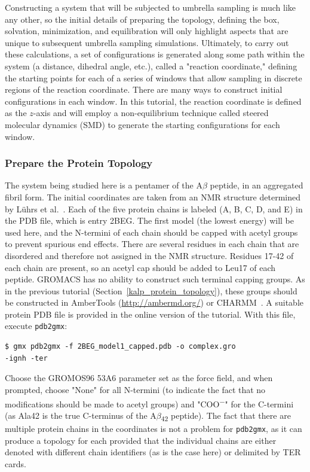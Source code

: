 \documentclass[9pt,tutorial]{livecoms}
\begin{document}
Constructing a system that will be subjected to umbrella sampling is much like any other, so the initial details of preparing the topology, defining the box, solvation, minimization, and equilibration will only highlight aspects that are unique to subsequent umbrella sampling simulations. Ultimately, to carry out these calculations, a set of configurations is generated along some path within the system (a distance, dihedral angle, etc.), called a "reaction coordinate," defining the starting points for each of a series of windows that allow sampling in discrete regions of the reaction coordinate. There are many ways to construct initial configurations in each window. In this tutorial, the reaction coordinate is defined as the $z$-axis and will employ a non-equilibrium technique called steered molecular dynamics (SMD) to generate the starting configurations for each window.

\subsubsection{Prepare the Protein Topology} \label{umbrella_protein_topology}

The system being studied here is a pentamer of the A$\beta$ peptide, in an aggregated fibril form. The initial coordinates are taken from an NMR structure determined by L\"uhrs et al.~\cite{Luhrs2005}. Each of the five protein chains is labeled (A, B, C, D, and E) in the PDB file, which is entry 2BEG. The first model (the lowest energy) will be used here, and the N-termini of each chain should be capped with acetyl groups to prevent spurious end effects. There are several residues in each chain that are disordered and therefore not assigned in the NMR structure. Residues 17-42 of each chain are present, so an acetyl cap should be added to Leu17 of each peptide. GROMACS has no ability to construct such terminal capping groups. As in the previous tutorial (Section~\ref{kalp_protein_topology}), these groups should be constructed in AmberTools (\url{http://ambermd.org/}) or CHARMM~\cite{Brooks2009}. A suitable protein PDB file is provided in the online version of the tutorial. With this file, execute \texttt{pdb2gmx}:

\begin{verbatim}
$ gmx pdb2gmx -f 2BEG_model1_capped.pdb -o complex.gro 
-ignh -ter
\end{verbatim}

Choose the GROMOS96 53A6 parameter set as the force field, and when prompted, choose "None" for all N-termini (to indicate the fact that no modifications should be made to acetyl groups) and "COO\textsuperscript{$-$}" for the C-termini (as Ala42 is the true C-terminus of the A$\beta$\textsubscript{42} peptide). The fact that there are multiple protein chains in the coordinates is not a problem for \texttt{pdb2gmx}, as it can produce a topology for each provided that the individual chains are either denoted with different chain identifiers (as is the case here) or delimited by TER cards.
\end{document}
